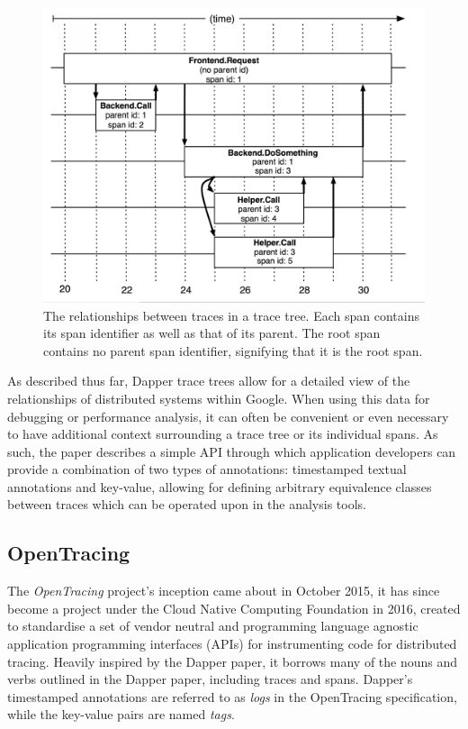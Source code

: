 \documentclass[12pt,pdftex,titlepage]{report}
\begin{document}
                \begin{figure}[htb!]
                    \centering
                    \includegraphics[scale=1.2]{dappertrace.png}
                    \caption[The relationships between traces in a trace tree]{The relationships between traces in a trace tree. Each span contains its span 
                    identifier as well as that of its parent. The root span contains no parent span identifier, signifying that it is the root span.}
                    \label{fig:dappertrace}
                \end{figure}

                As described thus far, Dapper trace trees allow for a detailed view of the relationships of distributed systems within
                Google. When using this data for debugging or performance analysis, it can often be convenient or even necessary to 
                have additional context surrounding a trace tree or its individual spans. As such, the paper describes a simple API 
                through which application developers can provide a combination of two types of annotations: timestamped textual annotations
                and key-value, allowing for defining arbitrary equivalence classes between traces which can be operated upon in the analysis
                tools.

            \subsection{OpenTracing}
                The \textit{OpenTracing}\cite{opentracing} project's inception came about in October 2015, it has since become a project under the 
                Cloud Native Computing Foundation in 2016, created to standardise a set of vendor neutral and programming language agnostic
                application programming interfaces (APIs) for instrumenting code for distributed tracing. Heavily inspired by the Dapper
                paper, it borrows many of the nouns and verbs outlined in the Dapper paper, including traces and spans.
                Dapper's timestamped annotations are referred to as \textit{logs} in the OpenTracing specification, while the key-value pairs
                are named \textit{tags}. 
\end{document}

